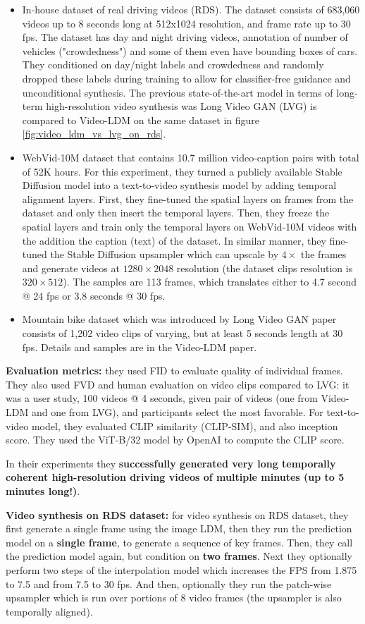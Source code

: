 \begin{itemize}
    \item In-house dataset of real driving videos (RDS). The dataset consists of 683,060 videos up to 8 seconds long at 512x1024 resolution, and frame rate up to 30 fps. The dataset has day and night driving videos, annotation of number of vehicles ("crowdedness") and some of them even have bounding boxes of cars. They conditioned on day/night labels and crowdedness and randomly dropped these labels during training to allow for classifier-free guidance and unconditional synthesis. The previous state-of-the-art model in terms of long-term high-resolution video synthesis was Long Video GAN (LVG) \cite{brooks2022generating} is compared to Video-LDM on the same dataset in figure \ref{fig:video_ldm_vs_lvg_on_rds}.
    \item WebVid-10M dataset \cite{bain2021frozen} that contains 10.7 million video-caption pairs with total of 52K hours. For this experiment, they turned a publicly available Stable Diffusion model into a text-to-video synthesis model by adding temporal alignment layers. First, they fine-tuned the spatial layers on frames from the dataset and only then insert the temporal layers. Then, they freeze the spatial layers and train only the temporal layers on WebVid-10M videos with the addition the caption (text) of the dataset. In similar manner, they fine-tuned the Stable Diffusion upsampler which can upscale by $4\times$ the frames and generate videos at $1280\times 2048$ resolution (the dataset clips resolution is $320\times 512$). The samples are 113 frames, which translates either to 4.7 second @ 24 fps or 3.8 seconds @ 30 fps.
    \item Mountain bike dataset \cite{brooks2022generating} which was introduced by Long Video GAN paper consists of 1,202 video clips of varying, but at least 5 seconds length at 30 fps. Details and samples are in the Video-LDM paper.
\end{itemize}

\textbf{Evaluation metrics: } they used FID to evaluate quality of individual frames. They also used FVD and human evaluation on video clips compared to LVG: it was a user study, 100 videos @ 4 seconds, given pair of videos (one from Video-LDM and one from LVG), and participants select the most favorable. For text-to-video model, they evaluated CLIP similarity (CLIP-SIM), and also inception score. They used the ViT-B/32 \cite{openai_clip} model by OpenAI to compute the CLIP score.

In their experiments they \textbf{successfully generated very long temporally coherent high-resolution driving videos of multiple minutes (up to 5 minutes long!)}.

\textbf{Video synthesis on RDS dataset: } for video synthesis on RDS dataset, they first generate a single frame using the image LDM, then they run the prediction model on a \textbf{single frame}, to generate a sequence of key frames. Then, they call the prediction model again, but condition on \textbf{two frames}. Next they optionally perform two steps of the interpolation model which increases the FPS from 1.875 to 7.5 and from 7.5 to 30 fps. And then, optionally they run the patch-wise upsampler which is run over portions of 8 video frames (the upsampler is also temporally aligned).

